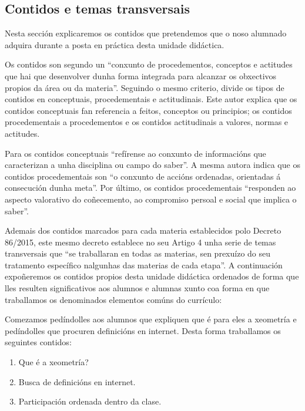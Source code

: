 \subsection{Contidos e temas transversais}\label{sec:contidos}

Nesta sección explicaremos os contidos que pretendemos que o noso alumnado adquira durante a posta en práctica desta unidade didáctica.

Os contidos son segundo  un ``conxunto de procedementos, conceptos e actitudes que hai que desenvolver dunha forma integrada para alcanzar os obxectivos propios da área ou da materia''. Seguindo o mesmo criterio,  divide os tipos de contidos en conceptuais, procedementais e actitudinais. Este autor explica que os contidos conceptuais fan referencia a feitos, conceptos ou principios; os contidos procedementais a procedementos e os contidos actitudinais a valores, normas e actitudes.

Para  os contidos conceptuais ``refírense ao conxunto de informacións que caracterizan a unha disciplina ou campo do saber''. A mesma autora indica que os contidos procedementais son ``o conxunto de accións ordenadas, orientadas á consecución dunha meta''. Por último, os contidos procedementais ``responden ao aspecto valorativo do coñecemento, ao compromiso persoal e social que implica o saber''.

Ademais dos contidos marcados para cada materia establecidos polo Decreto 86/2015, este mesmo decreto establece no seu Artigo 4 unha serie de temas transversais que ``se traballaran en todas as materias, sen prexuízo do seu tratamento específico nalgunhas das materias de cada etapa''. A continuación expoñeremos os contidos propios desta unidade didáctica ordenados de forma que lles resulten significativos aos alumnos e alumnas xunto coa forma en que traballamos os denominados elementos comúns do currículo:

Comezamos pedíndolles aos alumnos que expliquen que é para eles a xeometría e pedíndolles que procuren definicións en internet. Desta forma traballamos os seguintes contidos:

\begin{enumerate}[label=\bfseries Con\arabic*, align=left, leftmargin=1.5cm]
    \item\label{con:xeometria} Que é a xeometría?
    \item\label{con:buscadefinicions} Busca de definicións en internet.
    \item\label{con:participacionclase} Participación ordenada dentro da clase.
\end{enumerate}

